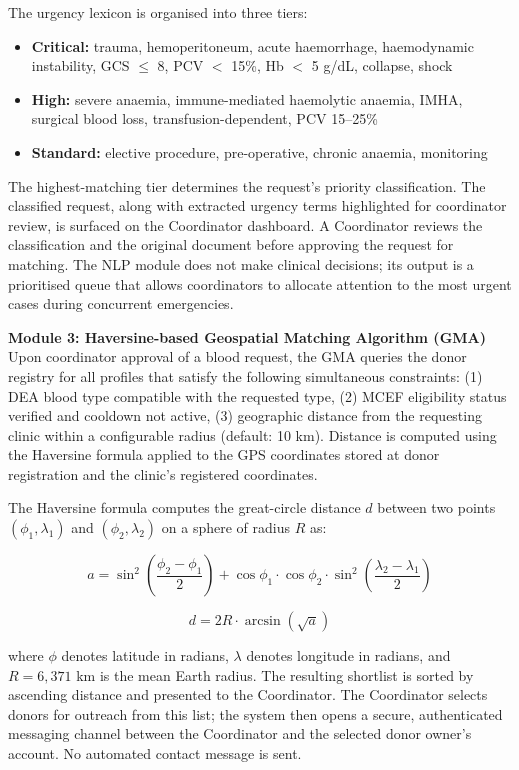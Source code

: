 \documentclass[12pt,a4paper]{article}
\begin{document}
\noindent The urgency lexicon is organised into three tiers:

\begin{itemize}[leftmargin=1.5em, itemsep=0.3em]
    \item \textbf{Critical:} trauma, hemoperitoneum, acute haemorrhage, haemodynamic instability, GCS $\leq$ 8, PCV $<$ 15\%, Hb $<$ 5 g/dL, collapse, shock
    \item \textbf{High:} severe anaemia, immune-mediated haemolytic anaemia, IMHA, surgical blood loss, transfusion-dependent, PCV 15--25\%
    \item \textbf{Standard:} elective procedure, pre-operative, chronic anaemia, monitoring
\end{itemize}

\noindent The highest-matching tier determines the request's priority classification. The classified request, along with extracted urgency terms highlighted for coordinator review, is surfaced on the Coordinator dashboard. A Coordinator reviews the classification and the original document before approving the request for matching. The NLP module does not make clinical decisions; its output is a prioritised queue that allows coordinators to allocate attention to the most urgent cases during concurrent emergencies.

\noindent\textbf{Module 3: Haversine-based Geospatial Matching Algorithm (GMA)}
\noindent Upon coordinator approval of a blood request, the GMA queries the donor registry for all profiles that satisfy the following simultaneous constraints: (1) DEA blood type compatible with the requested type, (2) MCEF eligibility status verified and cooldown not active, (3) geographic distance from the requesting clinic within a configurable radius (default: 10 km). Distance is computed using the Haversine formula applied to the GPS coordinates stored at donor registration and the clinic's registered coordinates.

\noindent The Haversine formula computes the great-circle distance $d$ between two points $(\phi_1, \lambda_1)$ and $(\phi_2, \lambda_2)$ on a sphere of radius $R$ as:

\[
a = \sin^2\!\left(\frac{\phi_2 - \phi_1}{2}\right) + \cos\phi_1 \cdot \cos\phi_2 \cdot \sin^2\!\left(\frac{\lambda_2 - \lambda_1}{2}\right)
\]

\[
d = 2R \cdot \arcsin\!\left(\sqrt{a}\right)
\]

\noindent where $\phi$ denotes latitude in radians, $\lambda$ denotes longitude in radians, and $R = 6{,}371$ km is the mean Earth radius. The resulting shortlist is sorted by ascending distance and presented to the Coordinator. The Coordinator selects donors for outreach from this list; the system then opens a secure, authenticated messaging channel between the Coordinator and the selected donor owner's account. No automated contact message is sent.
\end{document}
